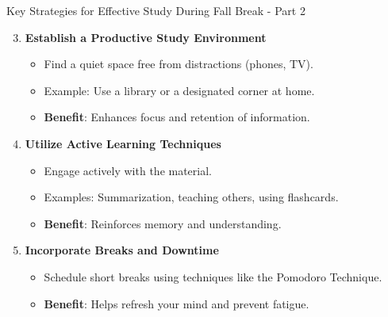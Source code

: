 \documentclass[aspectratio=169]{beamer}
\begin{document}
\begin{frame}[fragile]{Key Strategies for Effective Study During Fall Break - Part 2}
  \begin{enumerate}
    \setcounter{enumi}{2}
    \item \textbf{Establish a Productive Study Environment}
      \begin{itemize}
        \item Find a quiet space free from distractions (phones, TV).
        \item Example: Use a library or a designated corner at home.
        \item \textbf{Benefit}: Enhances focus and retention of information.
      \end{itemize}

    \item \textbf{Utilize Active Learning Techniques}
      \begin{itemize}
        \item Engage actively with the material.
        \item Examples: Summarization, teaching others, using flashcards.
        \item \textbf{Benefit}: Reinforces memory and understanding.
      \end{itemize}

    \item \textbf{Incorporate Breaks and Downtime}
      \begin{itemize}
        \item Schedule short breaks using techniques like the Pomodoro Technique.
        \item \textbf{Benefit}: Helps refresh your mind and prevent fatigue.
      \end{itemize}
  \end{enumerate}
\end{frame}
\end{document}
